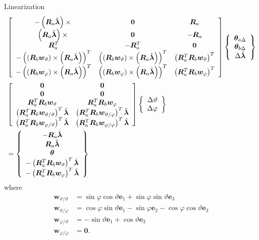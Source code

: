 \documentclass[10pt,fleqn,subeqn]{report}
\newcommand{\T}[1]{\bm{#1}}
\begin{document}
Linearization
\begin{align}
	& \sqbr{\matr{ccc}{
		-\plbr{\T{R}_a \hat{\T{\lambda}}}\times{} & \T{0} & \T{R}_a \\
%
		\plbr{\T{R}_a \hat{\T{\lambda}}}\times{} & \T{0} & -\T{R}_a \\
%
		\T{R}_a^T & -\T{R}_a^T & \T{0} \\
%
		- \plbr{\plbr{\T{R}_b \T{w}_{\vartheta}}\times\plbr{\T{R}_a \hat{\T{\lambda}}}}^T
			& \plbr{\plbr{\T{R}_b \T{w}_{\vartheta}}\times\plbr{\T{R}_a \hat{\T{\lambda}}}}^T
			& \plbr{\T{R}_a^T \T{R}_b \T{w}_{\vartheta}}^T \\
%
		- \plbr{\plbr{\T{R}_b \T{w}_{\varphi}}\times\plbr{\T{R}_a \hat{\T{\lambda}}}}^T
			& \plbr{\plbr{\T{R}_b \T{w}_{\varphi}}\times\plbr{\T{R}_a \hat{\T{\lambda}}}}^T
			& \plbr{\T{R}_a^T \T{R}_b \T{w}_{\varphi}}^T
	}} \cubr{\cvvect{
		\T{\theta}_{a\Delta} \\
		\T{\theta}_{b\Delta} \\
		\Delta\hat{\T{\lambda}} \\
	}} \nonumber \\
	& \sqbr{\matr{cc}{
		\T{0} & \T{0} \\
%
		\T{0} & \T{0} \\
%
		\T{R}_a^T \T{R}_b \T{w}_{\vartheta}
			& \T{R}_a^T \T{R}_b \T{w}_{\varphi} \\
%
		\plbr{\T{R}_a^T \T{R}_b \T{w}_{\vartheta/\vartheta}}^T \hat{\T{\lambda}}
		& \plbr{\T{R}_a^T \T{R}_b \T{w}_{\vartheta/\varphi}}^T \hat{\T{\lambda}} \\
%
		\plbr{\T{R}_a^T \T{R}_b \T{w}_{\varphi/\vartheta}}^T \hat{\T{\lambda}}
		& \plbr{\T{R}_a^T \T{R}_b \T{w}_{\varphi/\varphi}}^T \hat{\T{\lambda}}
	}} \cubr{\cvvect{
		\Delta\vartheta \\
		\Delta\varphi
	}} \nonumber \\
	&= \cubr{\cvvect{
		-\T{R}_a \hat{\T{\lambda}} \\
		\T{R}_a \hat{\T{\lambda}} \\
		\T{\theta} \\
		- \plbr{\T{R}_a^T \T{R}_b \T{w}_{\vartheta}}^T \hat{\T{\lambda}} \\
		- \plbr{\T{R}_a^T \T{R}_b \T{w}_{\varphi}}^T \hat{\T{\lambda}}
	}}
\end{align}
where
\begin{subequations}
\begin{align}
	\T{w}_{\vartheta/\vartheta}
	&= \sin\varphi \cos\vartheta \T{e}_1
	+ \sin\varphi \sin\vartheta \T{e}_3 \\
	\T{w}_{\vartheta/\varphi}
	&= \cos\varphi \sin\vartheta \T{e}_1
	- \sin\varphi \T{e}_2
	- \cos\varphi \cos\vartheta \T{e}_3 \\
	\T{w}_{\varphi/\vartheta}
	&= - \sin\vartheta \T{e}_1 + \cos\vartheta \T{e}_3 \\
	\T{w}_{\varphi/\varphi}
	&= \T{0} .
\end{align}
\end{subequations}
\end{document}
